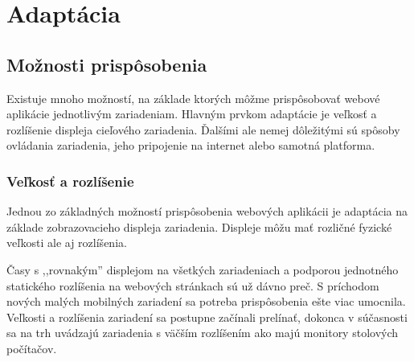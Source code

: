 


\section{Adaptácia} %
\label{sec:adapt_cia}

\subsection{Možnosti prispôsobenia} %
\label{sub:mo_nosti_prisp_sobenia}

Existuje mnoho možností, na základe ktorých môžme prispôsobovať webové aplikácie jednotlivým zariadeniam. Hlavným prvkom adaptácie je veľkosť a rozlíšenie displeja cieľového zariadenia. Ďalšími ale nemej dôležitými sú spôsoby ovládania zariadenia, jeho pripojenie na internet alebo samotná platforma.

\subsubsection{Veľkosť a rozlíšenie} %
\label{ssub:ve_kos_a_rozl_enie}

Jednou zo základných možností prispôsobenia webových aplikácii je adaptácia na základe zobrazovacieho displeja zariadenia. Displeje môžu mať rozličné fyzické veľkosti ale aj rozlíšenia.

Časy s ,,rovnakým'' displejom na všetkých zariadeniach a podporou jednotného statického rozlíšenia na webových stránkach sú už dávno preč. S príchodom nových malých mobilných zariadení sa potreba prispôsobenia ešte viac umocnila. Veľkosti a rozlíšenia zariadení sa postupne začínali prelínať, dokonca v súčasnosti sa na trh uvádzajú zariadenia s väčším rozlíšením ako majú monitory stolových počítačov.


